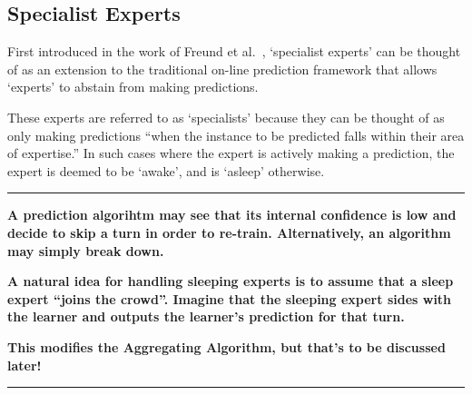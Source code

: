 \subsection{Specialist Experts}
First introduced in the work of Freund et al.\ \cite{freund:1997}, `specialist experts' can be thought of as an extension to the traditional on-line prediction framework that allows `experts' to abstain from making predictions. 

These experts are referred to as `specialists' because they can be thought of as only making predictions ``when the instance to be predicted falls within their area of expertise.'' In such cases where the expert is actively making a prediction, the expert is deemed to be `awake', and is `asleep' otherwise.
\newline
\rule{\textwidth}{0.1pt}
\textbf{A prediction algorihtm may see that its internal confidence is low and decide to skip a turn in order to re-train. Alternatively, an algorithm may simply break down.}

\textbf{A natural idea for handling sleeping experts is to assume that a sleep expert ``joins the crowd''. Imagine that the sleeping expert sides with the learner and outputs the learner's prediction for that turn.}

\textbf{This modifies the Aggregating Algorithm, but that's to be discussed later!}
\newline
\rule{\textwidth}{0.1pt}

